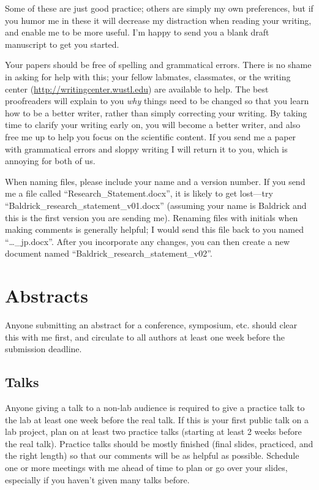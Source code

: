 \documentclass[letterpaper,12pt,oneside]{memoir}
\begin{document}
Some of these are just good practice; others are simply my own preferences, but if you humor me in these it will decrease my distraction when reading your writing, and  enable me to be more useful. I'm happy to send you a blank draft manuscript to get you started.

Your papers should be free of spelling and grammatical errors. There is no shame in asking for help with this; your fellow labmates, classmates, or the writing center (\url{http://writingcenter.wustl.edu}) are available to help. The best proofreaders will explain to you \textit{why} things need to be changed so that you learn how to be a better writer, rather than simply correcting your writing. By taking time to clarify your writing early on, you will become a better writer, and also free me up to help you focus on the scientific content. If you send me a paper with grammatical errors and sloppy writing I will return it to you, which is annoying for both of us.


 \begin{shaded}
\noindent When naming files, please include your name and a version number. If you send me a file called ``Research\_Statement.docx'', it is likely to get lost---try ``Baldrick\_research\_statement\_v01.docx'' (assuming your name is Baldrick and this is the first version you are sending me). Renaming files with initials when making comments is generally helpful; I would send this file back to you named ``\ldots\_jp.docx''. After you incorporate any changes, you can then create a new document named ``Baldrick\_research\_statement\_v02''.
\end{shaded}




\section{Abstracts}
Anyone submitting an abstract for a conference, symposium, etc. should clear this with me first, and circulate to all authors at least one week before the submission deadline.

\subsection{Talks}
Anyone giving a talk to a non-lab audience is required to give a practice talk to the lab at least one week before the real talk. If this is your first public talk on a lab project, plan on at least two practice talks (starting at least 2 weeks before the real talk). Practice talks should be mostly finished (final slides, practiced, and the right length) so that our comments will be as helpful as possible. Schedule one or more meetings with me ahead of time to plan or go over your slides, especially if you haven't given many talks before.
\end{document}
